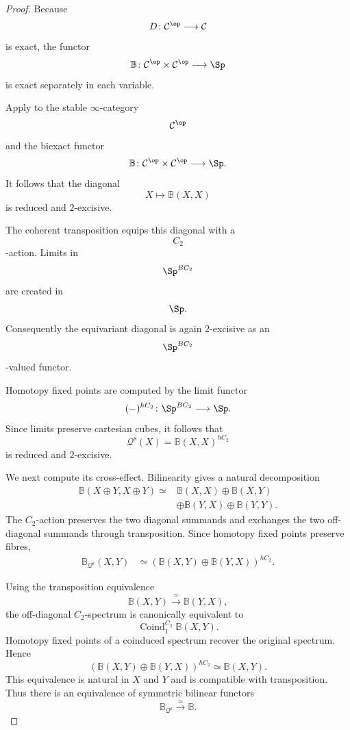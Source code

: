 \begin{proof}
Because
\[
    D
    \colon
    \mathcal C^{\op}
    \longrightarrow
    \mathcal C
\]
is exact, the functor
\[
    \mathbb B
    \colon
    \mathcal C^{\op}\times\mathcal C^{\op}
    \longrightarrow
    \Sp
\]
is exact separately in each variable.

Apply
to the stable $\infty$-category
\[
    \mathcal C^{\op}
\]
and the biexact functor
\[
    \mathbb B
    \colon
    \mathcal C^{\op}\times\mathcal C^{\op}
    \longrightarrow
    \Sp.
\]
It follows that the diagonal
\[
    X
    \longmapsto
    \mathbb B(X,X)
\]
is reduced and $2$-excisive.

The coherent transposition equips this diagonal with a
\[
    C_2
\]
-action. Limits in
\[
    \Sp^{BC_2}
\]
are created in
\[
    \Sp.
\]
Consequently the equivariant diagonal is again $2$-excisive as an
\[
    \Sp^{BC_2}
\]
-valued functor.

Homotopy fixed points are computed by the limit functor
\[
    (-)^{hC_2}
    \colon
    \Sp^{BC_2}
    \longrightarrow
    \Sp.
\]
Since limits preserve cartesian cubes, it follows that
\[
    \mathcal Q^{\mathrm s}(X)
    =
    \mathbb B(X,X)^{hC_2}
\]
is reduced and $2$-excisive.

We next compute its cross-effect. Bilinearity gives a natural
decomposition
\[
\begin{aligned}
    \mathbb B(X\oplus Y,X\oplus Y)
    \simeq{}&
    \mathbb B(X,X)
    \oplus
    \mathbb B(X,Y)
    \\
    &\oplus
    \mathbb B(Y,X)
    \oplus
    \mathbb B(Y,Y).
\end{aligned}
\]
The $C_2$-action preserves the two diagonal summands and exchanges the two
off-diagonal summands through transposition. Since homotopy fixed points
preserve fibres,
\[
\begin{aligned}
    \mathbb B_{\mathcal Q^{\mathrm s}}(X,Y)
    &\simeq
    \left(
        \mathbb B(X,Y)
        \oplus
        \mathbb B(Y,X)
    \right)^{hC_2}.
\end{aligned}
\]

Using the transposition equivalence
\[
    \mathbb B(X,Y)
    \xrightarrow{\;\simeq\;}
    \mathbb B(Y,X),
\]
the off-diagonal $C_2$-spectrum is canonically equivalent to
\[
    \operatorname{Coind}_{1}^{C_2}
    \mathbb B(X,Y).
\]
Homotopy fixed points of a coinduced spectrum recover the original
spectrum. Hence
\[
    \left(
        \mathbb B(X,Y)
        \oplus
        \mathbb B(Y,X)
    \right)^{hC_2}
    \simeq
    \mathbb B(X,Y).
\]
This equivalence is natural in $X$ and $Y$ and is compatible with
transposition. Thus there is an equivalence of symmetric bilinear
functors
\[
    \mathbb B_{\mathcal Q^{\mathrm s}}
    \xrightarrow{\;\simeq\;}
    \mathbb B.
\]


\end{proof}
